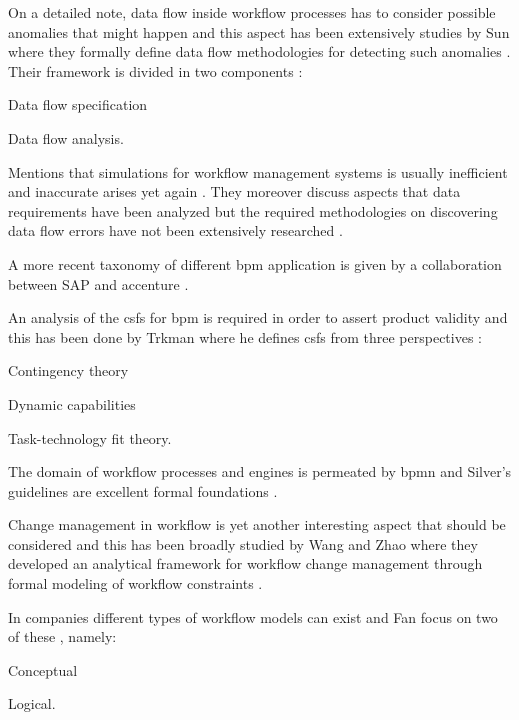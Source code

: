 \documentclass{seal_thesis}
\begin{document}
On a detailed note, data flow inside workflow processes has to consider possible anomalies that might happen and this aspect has been extensively studies by Sun \etal where they formally define data flow methodologies for detecting such anomalies \cite{Sun2006}. Their framework is divided in two components \cite{Sun2006}:
\begin{enumerate*}
	\item Data flow specification
	\item Data flow analysis.
\end{enumerate*}

Mentions that simulations for workflow management systems is usually inefficient and inaccurate arises yet again \cite{Sun2006}. They moreover discuss aspects that data requirements have been analyzed but the required methodologies on discovering data flow errors have not been extensively researched \cite{Sun2006}.

A more recent taxonomy of different \gls{bpm} application is given by a collaboration between SAP and accenture \cite{EvolvedTechnologist2009}.

An analysis of the \glspl{csf} for \gls{bpm} is required in order to assert product validity and this has been done by Trkman where he defines \glspl{csf} from three perspectives \cite{Trkman2010}:
\begin{enumerate*}
	\item Contingency theory
	\item Dynamic capabilities
	\item Task-technology fit theory.
\end{enumerate*}

The domain of workflow processes and engines is permeated by \gls{bpmn} and Silver's guidelines are excellent formal foundations \cite{Silver2011}.

Change management in workflow is yet another interesting aspect that should be considered and this has been broadly studied by Wang and Zhao where they developed an analytical framework for workflow change management through formal modeling of workflow constraints \cite{Wang2011}.

In companies different types of workflow models can exist and Fan \etal focus on two of these \cite{Fan2012}, namely:
\begin{enumerate*}
	\item Conceptual
	\item Logical.
\end{enumerate*}
\end{document}
